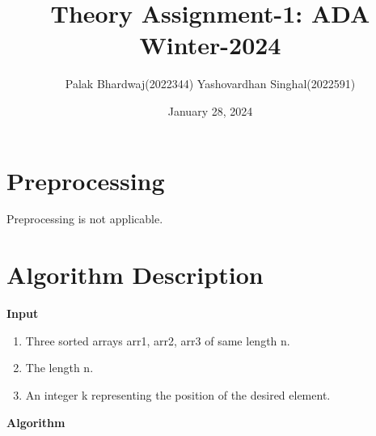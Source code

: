 \documentclass[8pt]{article}
\title{\vspace{-3em}Theory Assignment-1: ADA Winter-2024}
\author{Palak Bhardwaj(2022344) \phantom{fddvdssvs}Yashovardhan Singhal(2022591)}
\date{January 28, 2024}
\begin{document}
\maketitle


\section{Preprocessing}



\fontsize{12}{8}\selectfont Preprocessing is not applicable.

 \vspace{-1em}


\section{Algorithm Description}

\vspace{-0.6em}

\textbf{Input}

\vspace{-0.5em}

\hspace{1em} \begin{enumerate}
    \item Three sorted arrays arr1, arr2, arr3 of same length n.
    \item The length n.
    \item An integer k representing the position of the desired element.
\end{enumerate}

\hspace{-1.5em}\textbf{Algorithm}
\end{document}
